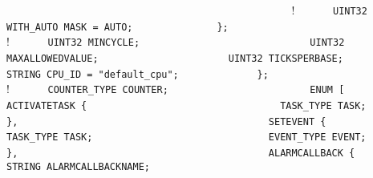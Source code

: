 {{{{{{{{{{\lstinline!                                             ! \newline
\lstinline!    ! {        ! \newline
\lstinline!      UINT32 WITH_AUTO MASK = AUTO;          ! \newline
\lstinline!    };                                       ! \newline
\lstinline!                                             ! \newline
\lstinline!    ! {                   ! \newline
\lstinline!      UINT32 MINCYCLE;                       ! \newline
\lstinline!      UINT32 MAXALLOWEDVALUE;                ! \newline
\lstinline!      UINT32 TICKSPERBASE;                   ! \newline
\lstinline!                                             ! \newline
\lstinline!      STRING CPU_ID = "default_cpu";         ! \newline
\lstinline!    };                                       ! \newline
\lstinline!                                             ! \newline
\lstinline!    ! {                     ! \newline
\lstinline!      COUNTER_TYPE COUNTER;                  ! \newline
\lstinline!      ENUM [                                 ! \newline
\lstinline!        ACTIVATETASK {                       ! \newline
\lstinline!          TASK_TYPE TASK;                    ! \newline
\lstinline!        },                                   ! \newline
\lstinline!        SETEVENT {                           ! \newline
\lstinline!          TASK_TYPE TASK;                    ! \newline
\lstinline!          EVENT_TYPE EVENT;                  ! \newline
\lstinline!        },                                   ! \newline
\lstinline!        ALARMCALLBACK {                      ! \newline
\lstinline!          STRING ALARMCALLBACKNAME;          ! \newline
}}}}}}}}}}}}}
